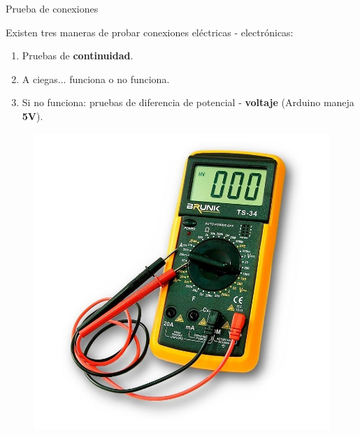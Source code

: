\begin{frame}[t]{Prueba de conexiones}\vspace{10pt}

Existen tres maneras de probar conexiones el\'ectricas - electr\'onicas:

\begin{enumerate}
	\item Pruebas de \textbf{continuidad}.
	\item A ciegas... funciona o no funciona. 
	\item Si no funciona: pruebas de diferencia de potencial - \textbf{voltaje} (Arduino maneja \textbf{5V}).
\end{enumerate}

\begin{figure}
	\centering
	\includegraphics[scale=0.18]{Images/mult.jpg}
\end{figure}

\end{frame}
